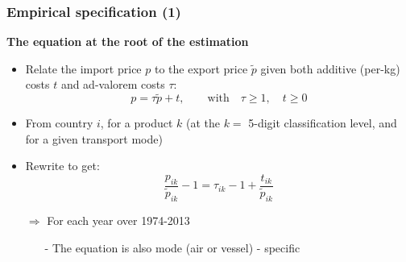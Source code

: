 \documentclass[10 pt,Helvetica, french]{beamer}
\begin{document}
\begin{frame}
\frametitle{Empirical specification (1)}
\textbf{The equation at the root of the estimation}
\begin{itemize}
\item Relate the import price $p$ to the export price $\widetilde{p}$ given both additive (per-kg) costs $t$ and ad-valorem costs $\tau$:
$$p = \tau \widetilde{p} + t, \qquad \text{with}\quad \tau \geq 1,\quad t \geq 0$$
\item From country $i$, for a product $k$ (at the $k=$ 5-digit classification level, and for a given transport mode)   \vspace{0.1cm}
\item Rewrite to get:
\begin{equation}
\frac{p_{ik}}{\widetilde{p}_{ik}} -1 = \tau_{ik} -1 +\frac{t_{ik}}{ \widetilde{p}_{ik}} \label{eq:basis_equation}
\end{equation}
\item[$\Rightarrow$] For each year over 1974-2013\vspace{0.1cm}
\begin{itemize}
\item[-] The equation is also mode (air or vessel) - specific
\end{itemize}
\end{itemize}
\end{frame}
\end{document}
